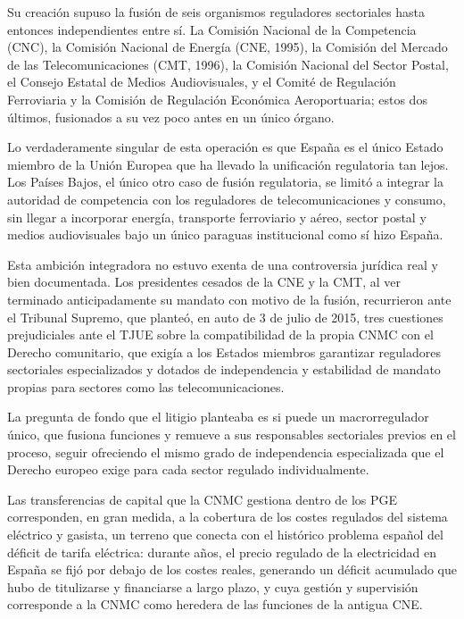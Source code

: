 \documentclass[10pt,a4paper]{article}
\begin{document}
Su creación supuso la fusión de seis organismos reguladores sectoriales hasta entonces independientes entre sí. La Comisión Nacional de la Competencia (CNC), la Comisión Nacional de Energía (CNE, 1995), la Comisión del Mercado de las Telecomunicaciones (CMT, 1996), la Comisión Nacional del Sector Postal, el Consejo Estatal de Medios Audiovisuales, y el Comité de Regulación Ferroviaria y la Comisión de Regulación Económica Aeroportuaria; estos dos últimos, fusionados a su vez poco antes en un único órgano. 

Lo verdaderamente singular de esta operación es que España es el único Estado miembro de la Unión Europea que ha llevado la unificación regulatoria tan lejos. Los Países Bajos, el único otro caso de fusión regulatoria, se limitó a integrar la autoridad de competencia con los reguladores de telecomunicaciones y consumo, sin llegar a incorporar energía, transporte ferroviario y aéreo, sector postal y medios audiovisuales bajo un único paraguas institucional como sí hizo España.

Esta ambición integradora no estuvo exenta de una controversia jurídica real y bien documentada. Los presidentes cesados de la CNE y la CMT, al ver terminado anticipadamente su mandato con motivo de la fusión, recurrieron ante el Tribunal Supremo, que planteó, en auto de 3 de julio de 2015, tres cuestiones prejudiciales ante el TJUE sobre la compatibilidad de la propia CNMC con el Derecho comunitario, que exigía a los Estados miembros garantizar reguladores sectoriales especializados y dotados de independencia y estabilidad de mandato propias para sectores como las telecomunicaciones. 

La pregunta de fondo que el litigio planteaba es si puede un macrorregulador único, que fusiona funciones y remueve a sus responsables sectoriales previos en el proceso, seguir ofreciendo el mismo grado de independencia especializada que el Derecho europeo exige para cada sector regulado individualmente.

Las transferencias de capital que la CNMC gestiona dentro de los PGE corresponden, en gran medida, a la cobertura de los costes regulados del sistema eléctrico y gasista, un terreno que conecta con el histórico problema español del déficit de tarifa eléctrica: durante años, el precio regulado de la electricidad en España se fijó por debajo de los costes reales, generando un déficit acumulado que hubo de titulizarse y financiarse a largo plazo, y cuya gestión y supervisión corresponde a la CNMC como heredera de las funciones de la antigua CNE.
\end{document}
